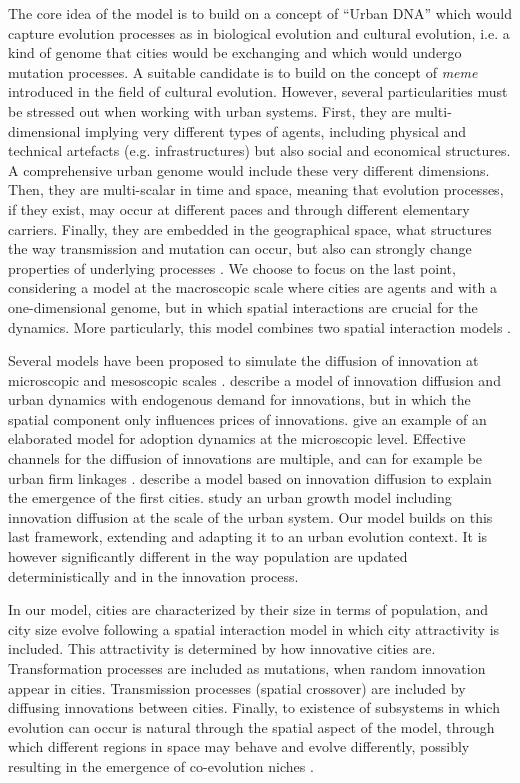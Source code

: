 \documentclass[letterpaper]{article}
\begin{document}
The core idea of the model is to build on a concept of ``Urban DNA'' which would capture evolution processes as in biological evolution and cultural evolution, i.e. a kind of genome that cities would be exchanging and which would undergo mutation processes. A suitable candidate is to build on the concept of \emph{meme} introduced in the field of cultural evolution. However, several particularities must be stressed out when working with urban systems. First, they are multi-dimensional implying very different types of agents, including physical and technical artefacts (e.g. infrastructures) but also social and economical structures. A comprehensive urban genome would include these very different dimensions. Then, they are multi-scalar in time and space, meaning that evolution processes, if they exist, may occur at different paces and through different elementary carriers. Finally, they are embedded in the geographical space, what structures the way transmission and mutation can occur, but also can strongly change properties of underlying processes \citep{raimbault2019space}. We choose to focus on the last point, considering a model at the macroscopic scale where cities are agents and with a one-dimensional genome, but in which spatial interactions are crucial for the dynamics. More particularly, this model combines two spatial interaction models \citep{fotheringham1989spatial}.


Several models have been proposed to simulate the diffusion of innovation at microscopic and mesoscopic scales \citep{kiesling2012agent}. \cite{blommestein1987adoption} describe a model of innovation diffusion and urban dynamics with endogenous demand for innovations, but in which the spatial component only influences prices of innovations. \cite{deffuant2005individual} give an example of an elaborated model for adoption dynamics at the microscopic level. Effective channels for the diffusion of innovations are multiple, and can for example be urban firm linkages \citep{rozenblat2007firm}. \cite{pumain2017simpoplocal} describe a model based on innovation diffusion to explain the emergence of the first cities. \cite{favaro2011gibrat} study an urban growth model including innovation diffusion at the scale of the urban system. Our model builds on this last framework, extending and adapting it to an urban evolution context. It is however significantly different in the way population are updated deterministically and in the innovation process.

In our model, cities are characterized by their size in terms of population, and city size evolve following a spatial interaction model in which city attractivity is included. This attractivity is determined by how innovative cities are. Transformation processes are included as mutations, when random innovation appear in cities. Transmission processes (spatial crossover) are included by diffusing innovations between cities. Finally, to existence of subsystems in which evolution can occur is natural through the spatial aspect of the model, through which different regions in space may behave and evolve differently, possibly resulting in the emergence of co-evolution niches \citep{holland2012signals,raimbault2018co}.
\end{document}
